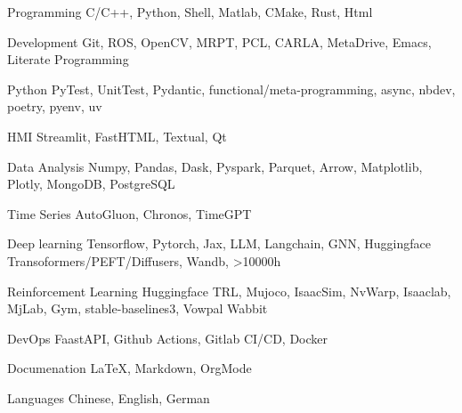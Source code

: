 \documentclass[../cv.tex]{subfiles}
\begin{document}


\begin{cvskills}

  \cvskill
    {Programming} %
    {C/C++, Python, Shell, Matlab, CMake, Rust, Html} %

  \cvskill
    {Development} %
    {Git, ROS, OpenCV, MRPT, PCL, CARLA, MetaDrive, Emacs, Literate Programming} %

  \cvskill
    {Python} %
    {PyTest, UnitTest, Pydantic, functional/meta-programming, async, nbdev, poetry, pyenv, uv} %

  \cvskill
    {HMI} %
    {Streamlit, FastHTML, Textual, Qt} %

  \cvskill
    {Data Analysis} %
    {Numpy, Pandas, Dask, Pyspark, Parquet, Arrow, Matplotlib, Plotly, MongoDB, PostgreSQL} %

  \cvskill
    {Time Series} %
    {AutoGluon, Chronos, TimeGPT} %

  \cvskill
    {Deep learning} %
    {Tensorflow, Pytorch, Jax, LLM, Langchain, GNN, Huggingface Transoformers/PEFT/Diffusers, Wandb, >10000h} %

  \cvskill
    {Reinforcement Learning} %
    {Huggingface TRL, Mujoco, IsaacSim, NvWarp, Isaaclab, MjLab, Gym, stable-baselines3, Vowpal Wabbit} %

  \cvskill
    {DevOps} %
    {FaastAPI, Github Actions, Gitlab CI/CD, Docker} %

  \cvskill
    {Documenation} %
    {LaTeX, Markdown, OrgMode} %

  \cvskill
    {Languages} %
    {Chinese, English, German} %

\end{cvskills}
\end{document}
